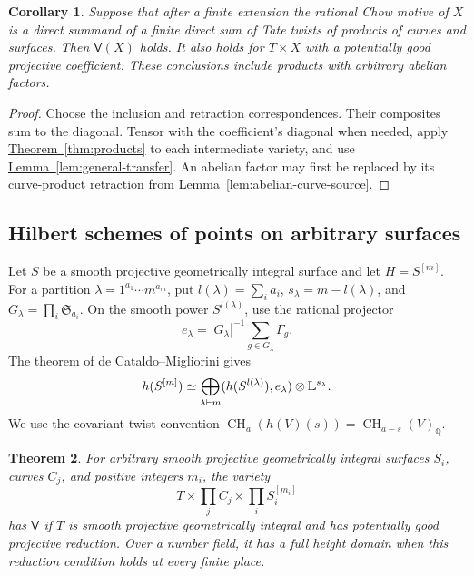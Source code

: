 \documentclass[11pt,a4paper]{article}
\newtheorem{theorem}{Theorem}[section]
\newtheorem{corollary}[theorem]{Corollary}
\theoremstyle{definition}
\theoremstyle{remark}\newtheorem{remark}[theorem]{Remark}
\numberwithin{equation}{section}
\newcommand{\Q}{\mathbb Q}\newcommand{\R}{\mathbb R}\newcommand{\C}{\mathbb C}
\newcommand{\CH}{\operatorname{CH}}\newcommand{\an}{\mathrm{an}}
\newcommand{\thmref}[1]{\hyperref[#1]{\textcolor{resultlink}{Theorem~\ref*{#1}}}}
\newcommand{\lemref}[1]{\hyperref[#1]{\textcolor{resultlink}{Lemma~\ref*{#1}}}}
\begin{document}
\begin{corollary}\label{cor:surface-envelope}
Suppose that after a finite extension the rational Chow motive of
$X$ is a direct summand of a finite direct sum of Tate twists of
products of curves and surfaces. Then $\mathsf V(X)$ holds. It also
holds for $T\times X$ with a potentially good projective coefficient.
These conclusions include products with arbitrary abelian factors.
\end{corollary}

\begin{proof}
Choose the inclusion and retraction correspondences. Their composites
sum to the diagonal. Tensor with the coefficient's diagonal when
needed, apply \thmref{thm:products} to each intermediate variety,
and use \lemref{lem:general-transfer}. An abelian factor may first be
replaced by its curve-product retraction from
\lemref{lem:abelian-curve-source}.
\end{proof}

\subsection{Hilbert schemes of points on arbitrary surfaces}

Let $S$ be a smooth projective geometrically integral surface and
let $H=S^{[m]}$. For a
partition $\lambda=1^{a_1}\cdots m^{a_m}$, put
$l(\lambda)=\sum_i a_i$, $s_\lambda=m-l(\lambda)$, and
$G_\lambda=\prod_i\mathfrak S_{a_i}$. On the smooth power
$S^{l(\lambda)}$, use the rational projector
\[
 e_\lambda=|G_\lambda|^{-1}\sum_{g\in G_\lambda}\Gamma_g.
\]
The theorem of de Cataldo--Migliorini
\cite[Theorem 6.2.1 and Remark 6.2.2]{DCM} gives
\begin{equation}\label{eq:hilbert-motive}
 h(S^{[m]})\simeq\bigoplus_{\lambda\vdash m}
       (h(S^{l(\lambda)}),e_\lambda)\otimes\mathbb L^{s_\lambda}.
\end{equation}
We use the covariant twist convention
$\CH_a(h(V)(s))=\CH_{a-s}(V)_\Q$.

\begin{theorem}\label{thm:hilbert}
For arbitrary smooth projective geometrically integral surfaces
$S_i$, curves $C_j$, and
positive integers $m_i$, the variety
\[
 T\times\prod_j C_j\times\prod_i S_i^{[m_i]}
\]
has $\mathsf V$ if $T$ is smooth projective geometrically integral
and has potentially good projective reduction.
Over a number field, it has a full height domain when this reduction
condition holds at every finite place.
\end{theorem}
\end{document}
